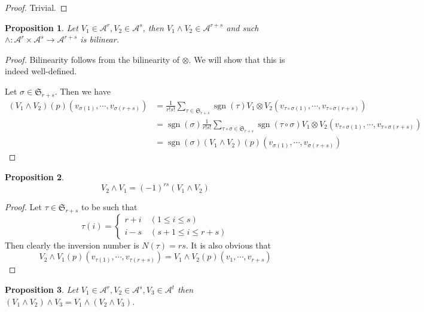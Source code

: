 \documentclass{article}
\newtheorem{proposition}{Proposition}[section]
\numberwithin{equation}{section}
\DeclareMathOperator{\sgn}{sgn}
\begin{document}
\begin{proof}
Trivial.
\end{proof}

\begin{proposition}
Let $V_1\in\mathcal{A}^r,V_2\in\mathcal{A}^s$, then $V_1\wedge V_2\in\mathcal{A}^{r+s}$ and such $\wedge:\mathcal{A}^r\times\mathcal{A}^s\to\mathcal{A}^{r+s}$ is bilinear.
\end{proposition}

\begin{proof}
Bilinearity follows from the bilinearity of $\otimes$. We will show that this is indeed well-defined.\\
\par Let $\sigma\in\mathfrak{S}_{r+s}$. Then we have
\begin{align*}
(V_1\wedge V_2)(p)(v_{\sigma(1)},\cdots,v_{\sigma(r+s)}) & = {\frac 1 {r!s!}}\sum_{\tau\in\mathfrak{S}_{r+s}}\sgn(\tau)V_1\otimes V_2(v_{\tau\circ\sigma(1)},\cdots,v_{\tau\circ\sigma(r+s)})\\
&=  \sgn(\sigma){\frac 1 {r!s!}}\sum_{\tau\circ\sigma\in\mathfrak{S}_{r+s}}\sgn(\tau\circ\sigma)V_1\otimes V_2(v_{\tau\circ\sigma(1)},\cdots,v_{\tau\circ\sigma(r+s)})\\
&=\sgn(\sigma)(V_1\wedge V_2)(p)(v_{\sigma(1)},\cdots,v_{\sigma(r+s)})
\end{align*}
\end{proof}

\begin{proposition}
\begin{equation*}
V_2\wedge V_1 = (-1)^{rs}(V_1\wedge V_2)
\end{equation*}
\end{proposition}
\begin{proof}
Let $\tau\in\mathfrak{S}_{r+s}$ to be such that
\begin{equation*}
\tau(i) = 
\begin{cases}
r+i \quad (1\leq i \leq s)\\
i-s\quad(s+1\leq i \leq r+s)
\end{cases}
\end{equation*}
Then clearly the inversion number is $N(\tau)=rs$. It is also obvious that
\begin{equation*}
V_2\wedge V_1(p)(v_{\tau(1)},\cdots,v_{\tau(r+s)}) = V_1\wedge V_2(p)(v_1,\cdots,v_{r+s})
\end{equation*}
\end{proof}

\begin{proposition}
Let $V_1\in\mathcal{A}^r,V_2\in\mathcal{A}^s,V_3\in\mathcal{A}^t$ then $(V_1\wedge V_2)\wedge V_3=V_1\wedge(V_2\wedge V_3)$.
\end{proposition}
\end{document}
